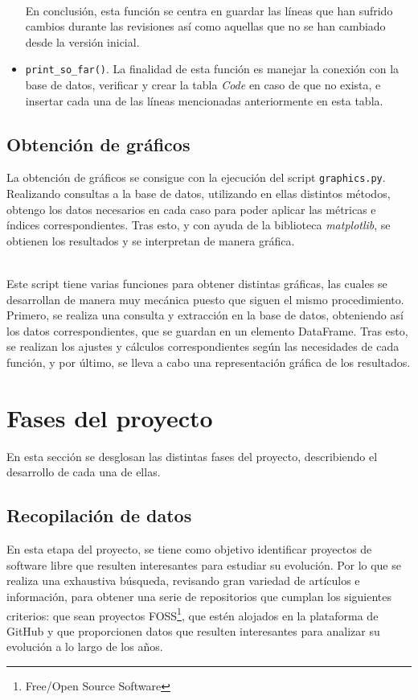 \documentclass[a4paper, 12pt]{book}
\begin{document}
\begin{itemize}
  \\En conclusión, esta función se centra en guardar las líneas que han sufrido cambios durante las revisiones así como aquellas que no se han cambiado desde la versión inicial.

  \item \texttt{print\_so\_far()}. La finalidad de esta función es manejar la conexión con la base de datos, verificar y crear la tabla \textit{Code} en caso de que no exista, e insertar cada una de las líneas mencionadas anteriormente en esta tabla.
\end{itemize}

\subsection{Obtención de gráficos}
\label{subsec:programa-graficos}

La obtención de gráficos se consigue con la ejecución del script \texttt{graphics.py}. Realizando consultas a la base de datos, utilizando en ellas distintos métodos, obtengo los datos necesarios en cada caso para poder aplicar las métricas e índices
correspondientes. Tras esto, y con ayuda de la biblioteca \textit{matplotlib}, se obtienen los resultados y se interpretan de manera gráfica.

\\Este script tiene varias funciones para obtener distintas gráficas, las cuales se desarrollan de manera muy mecánica puesto que siguen el mismo procedimiento. Primero, se realiza una consulta y extracción en la base de datos, obteniendo así los datos
correspondientes, que se guardan en un elemento DataFrame. Tras esto, se realizan los ajustes y cálculos correspondientes según las necesidades de cada función, y por último, se lleva a cabo una representación gráfica de los resultados.

\section{Fases del proyecto} 
\label{sec:fases-proyecto}

En esta sección se desglosan las distintas fases del proyecto, describiendo el desarrollo de cada una de ellas.

\subsection{Recopilación de datos}
\label{subsec:recopilacion}

En esta etapa del proyecto, se tiene como objetivo identificar proyectos de software libre que resulten interesantes para estudiar su evolución. Por lo que se realiza una exhaustiva búsqueda, revisando gran variedad de artículos e
información, para obtener una serie de repositorios que cumplan los siguientes criterios: que sean proyectos FOSS\footnote{Free/Open Source Software}, que estén alojados en la plataforma de GitHub y que proporcionen datos que resulten interesantes
para analizar su evolución a lo largo de los años.
\end{document}
